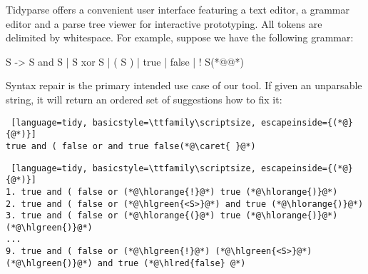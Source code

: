 \documentclass[runningheads]{llncs}
\DeclareRobustCommand{\hlred}[1]{{\sethlcolor{lred}\hl{#1}}}
\DeclareRobustCommand{\hlorange}[1]{{\sethlcolor{lorange}\hl{#1}}}
\DeclareRobustCommand{\hlgreen}[1]{{\sethlcolor{lgreen}\hl{#1}}}
\begin{document}
Tidyparse offers a convenient user interface featuring a text editor, a grammar editor and a parse tree viewer for interactive prototyping. All tokens are delimited by whitespace. For example, suppose we have the following grammar:

\begin{wholetidyinput}
  S -> S and S | S xor S | ( S ) | true | false | ! S(*@\caret{ }@*)
\end{wholetidyinput}

\noindent Syntax repair is the primary intended use case of our tool. If given an unparsable string, it will return an ordered set of suggestions how to fix it:

\begin{tcolorbox}[
top=0.1cm,
middle=0mm,
boxsep=0mm,
underlay unbroken and first={%
  \path[draw=none] (interior.north west) rectangle node[white]{\texttt{[image: ../figures/tidyparse\_logo.png]}} ([xshift=-10mm,yshift=-9mm]interior.north west);
}]
\begin{lstlisting} [language=tidy, basicstyle=\ttfamily\scriptsize, escapeinside={(*@}{@*)}]
true and ( false or and true false(*@\caret{ }@*)
\end{lstlisting}
\tcblower
\begin{lstlisting} [language=tidy, basicstyle=\ttfamily\scriptsize, escapeinside={(*@}{@*)}]
1. true and ( false or (*@\hlorange{!}@*) true (*@\hlorange{)}@*)
2. true and ( false or (*@\hlgreen{<S>}@*) and true (*@\hlorange{)}@*)
3. true and ( false or (*@\hlorange{(}@*) true (*@\hlorange{)}@*) (*@\hlgreen{)}@*)
...
9. true and ( false or (*@\hlgreen{!}@*) (*@\hlgreen{<S>}@*) (*@\hlgreen{)}@*) and true (*@\hlred{false} @*)
\end{lstlisting}
\end{tcolorbox}
%
\end{document}

